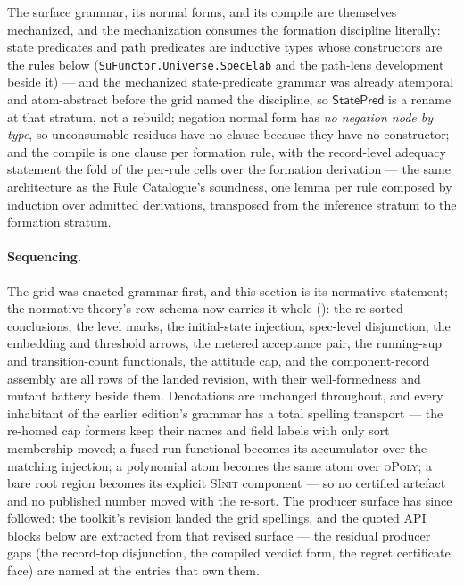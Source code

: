 The surface grammar, its normal forms, and its compile are
themselves mechanized, and the mechanization consumes the formation
discipline literally: state predicates and path predicates are
inductive types whose constructors are the rules below
(\texttt{SuFunctor.Universe.SpecElab} and the path-lens development
beside it) --- and the mechanized state-predicate grammar was
already atemporal and atom-abstract before the grid named the
discipline, so $\mathsf{StatePred}$ is a rename at that stratum, not
a rebuild; negation normal
form has \emph{no negation node by type}, so unconsumable residues
have no clause because they have no constructor; and the compile is
one clause per formation rule, with the record-level adequacy
statement the fold of the per-rule cells over the formation
derivation --- the same architecture as the Rule Catalogue's
soundness, one lemma per rule composed by induction over admitted
derivations, transposed from the inference stratum to the formation
stratum.

\paragraph{Sequencing.} The grid was enacted grammar-first, and this
section is its normative statement; the normative theory's row
schema now carries it whole (): the
re-sorted conclusions, the level marks, the initial-state injection,
spec-level disjunction, the embedding and threshold arrows, the
metered acceptance pair, the running-sup and transition-count
functionals, the attitude cap, and the component-record assembly are
all rows of the landed revision, with their well-formedness and
mutant battery beside them. Denotations are unchanged throughout,
and every inhabitant of the earlier edition's grammar has a total
spelling transport --- the re-homed cap formers keep their names and
field labels with only sort membership moved; a fused run-functional
becomes its accumulator over the matching injection; a polynomial
atom becomes the same atom over \textsc{oPoly}; a bare root region
becomes its explicit \textsc{SInit} component --- so no certified
artefact and no published number moved with the re-sort. The
producer surface has since followed: the toolkit's revision landed
the grid spellings, and the quoted API blocks below are extracted
from that revised surface --- the residual producer gaps (the
record-top disjunction, the compiled verdict form, the regret
certificate face) are named at the entries that own them.

